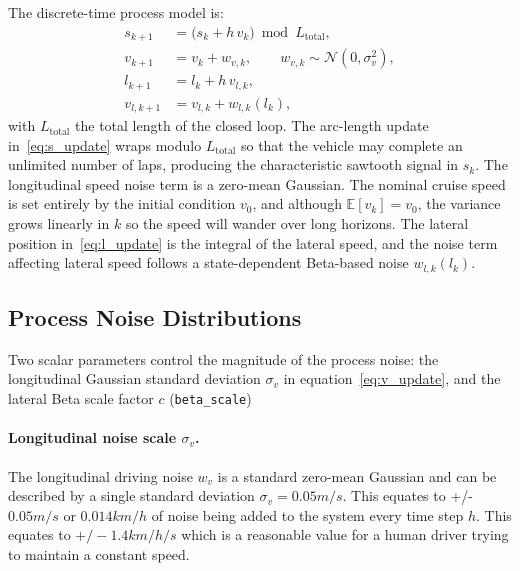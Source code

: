 \documentclass{article}
\begin{document}
The discrete-time process model is:
\begin{align}
    s_{k+1}    &= \bigl( s_k + h\,v_k \bigr) \bmod L_{\text{total}}, \label{eq:s_update} \\
    v_{k+1}    &= v_k + w_{v,k}, \qquad w_{v,k} \sim \mathcal{N}\!\left(0,\sigma_v^{2}\right), \label{eq:v_update} \\
    l_{k+1}    &= l_k + h\,v_{l,k}, \label{eq:l_update} \\
    v_{l,k+1}  &= v_{l,k} + w_{l,k}(l_k), \label{eq:vl_update}
\end{align}
with $L_{\text{total}}$ the total length of the closed loop. The arc-length update in~\eqref{eq:s_update} wraps modulo $L_{\text{total}}$ so that the vehicle may complete an unlimited number of laps, producing the characteristic sawtooth signal in $s_k$. The longitudinal speed noise term is a zero-mean Gaussian. The nominal cruise speed is set entirely by the initial condition $v_0$, and although $\mathbb{E}[v_k]=v_0$, the variance grows linearly in $k$ so the speed will wander over long horizons. The lateral position in~\eqref{eq:l_update} is the integral of the lateral speed, and the noise term affecting lateral speed follows a state-dependent Beta-based noise $w_{l,k}(l_k)$.

\subsection{Process Noise Distributions}
\label{subsec:noise}

Two scalar parameters control the magnitude of the process noise: the longitudinal Gaussian standard deviation $\sigma_v$ in equation~\eqref{eq:v_update}, and the lateral Beta scale factor $c$ (\texttt{beta\_scale})

\paragraph{Longitudinal noise scale $\sigma_v$.}
The longitudinal driving noise $w_v$ is a standard zero-mean Gaussian and can be described by a single standard deviation $\sigma_v = 0.05m/s$. This equates to +/- $0.05m/s$ or $0.014km/h$ of noise being added to the system every time step $h$. This equates to $+/- 1.4km/h/s$ which is a reasonable value for a human driver trying to maintain a constant speed. 
\end{document}
